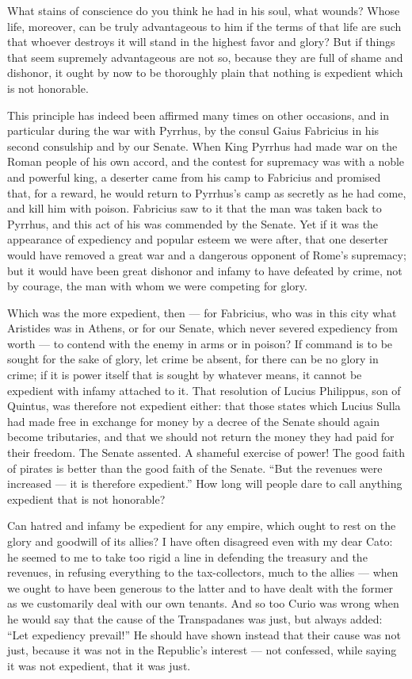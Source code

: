  What stains of conscience do you think he had in his soul, what wounds? Whose life, moreover, can be truly advantageous to him if the terms of that life are such that whoever destroys it will stand in the highest favor and glory? But if things that seem supremely advantageous are not so, because they are full of shame and dishonor, it ought by now to be thoroughly plain that nothing is expedient which is not honorable.

 This principle has indeed been affirmed many times on other occasions, and in particular during the war with Pyrrhus, by the consul Gaius Fabricius in his second consulship and by our Senate. When King Pyrrhus had made war on the Roman people of his own accord, and the contest for supremacy was with a noble and powerful king, a deserter came from his camp to Fabricius and promised that, for a reward, he would return to Pyrrhus's camp as secretly as he had come, and kill him with poison. Fabricius saw to it that the man was taken back to Pyrrhus, and this act of his was commended by the Senate. Yet if it was the appearance of expediency and popular esteem we were after, that one deserter would have removed a great war and a dangerous opponent of Rome's supremacy; but it would have been great dishonor and infamy to have defeated by crime, not by courage, the man with whom we were competing for glory.

 Which was the more expedient, then — for Fabricius, who was in this city what Aristides was in Athens, or for our Senate, which never severed expediency from worth — to contend with the enemy in arms or in poison? If command is to be sought for the sake of glory, let crime be absent, for there can be no glory in crime; if it is power itself that is sought by whatever means, it cannot be expedient with infamy attached to it. That resolution of Lucius Philippus, son of Quintus, was therefore not expedient either: that those states which Lucius Sulla had made free in exchange for money by a decree of the Senate should again become tributaries, and that we should not return the money they had paid for their freedom. The Senate assented. A shameful exercise of power! The good faith of pirates is better than the good faith of the Senate. ``But the revenues were increased — it is therefore expedient.'' How long will people dare to call anything expedient that is not honorable?

 Can hatred and infamy be expedient for any empire, which ought to rest on the glory and goodwill of its allies? I have often disagreed even with my dear Cato: he seemed to me to take too rigid a line in defending the treasury and the revenues, in refusing everything to the tax-collectors, much to the allies — when we ought to have been generous to the latter and to have dealt with the former as we customarily deal with our own tenants. And so too Curio was wrong when he would say that the cause of the Transpadanes was just, but always added: ``Let expediency prevail!'' He should have shown instead that their cause was not just, because it was not in the Republic's interest — not confessed, while saying it was not expedient, that it was just.

